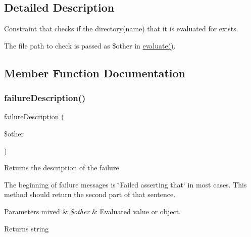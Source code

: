 \subsection{Detailed Description}
Constraint that checks if the directory(name) that it is evaluated for exists.

The file path to check is passed as \$other in \mbox{\hyperlink{class_p_h_p_unit___framework___constraint_a4c184790087f7d42c3daf0d0180fe5fb}{evaluate()}}. 

\subsection{Member Function Documentation}
\mbox{\label{class_p_h_p_unit___framework___constraint___directory_exists_aaabb679273bfb812df4d81c283754a59}} 
\subsubsection{\texorpdfstring{failure\+Description()}{failureDescription()}}
{\footnotesize\ttfamily failure\+Description (\begin{DoxyParamCaption}\item[{}]{\$other }\end{DoxyParamCaption})\hspace{0.3cm}{\ttfamily [protected]}}

Returns the description of the failure

The beginning of failure messages is \char`\"{}\+Failed asserting that\char`\"{} in most cases. This method should return the second part of that sentence.


\begin{DoxyParams}[1]{Parameters}
mixed & {\em \$other} & Evaluated value or object.\\
\hline
\end{DoxyParams}
\begin{DoxyReturn}{Returns}
string 
\end{DoxyReturn}
\mbox{\label{class_p_h_p_unit___framework___constraint___directory_exists_a9c9c337de483bbdbb9fa249a6c7c9cc5}} 
